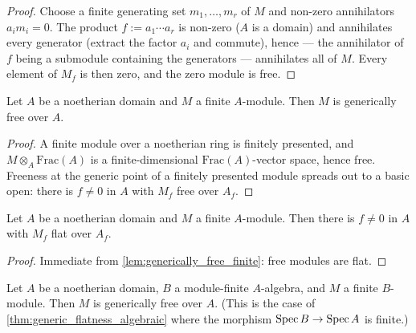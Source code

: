 \begin{proof}
\leanok
  Choose a finite generating set \(m_1, \dots, m_r\) of \(M\) and non-zero
  annihilators \(a_i m_i = 0\).  The product \(f := a_1 \cdots a_r\) is
  non-zero (\(A\) is a domain) and annihilates every generator (extract the
  factor \(a_i\) and commute), hence — the annihilator of \(f\) being a
  submodule containing the generators — annihilates all of \(M\).  Every
  element of \(M_f\) is then zero, and the zero module is free.
\end{proof}

\begin{lemma}\leanok
  \label{lem:generically_free_finite}
  Let \(A\) be a noetherian domain and \(M\) a finite \(A\)-module.  Then \(M\)
  is generically free over \(A\).
\end{lemma}

\begin{proof}
\leanok
  A finite module over a noetherian ring is finitely presented, and
  \(M \otimes_A \mathrm{Frac}(A)\) is a finite-dimensional
  \(\mathrm{Frac}(A)\)-vector space, hence free.  Freeness at the generic
  point of a finitely presented module spreads out to a basic open: there is
  \(f \ne 0\) in \(A\) with \(M_f\) free over \(A_f\).
\end{proof}

\begin{lemma}\leanok
  \label{lem:generically_flat_finite}
  Let \(A\) be a noetherian domain and \(M\) a finite \(A\)-module.  Then there
  is \(f \ne 0\) in \(A\) with \(M_f\) flat over \(A_f\).
\end{lemma}

\begin{proof}
\leanok
  Immediate from \cref{lem:generically_free_finite}: free modules are flat.
\end{proof}

\begin{lemma}\leanok
  \label{lem:generically_free_module_finite}
  Let \(A\) be a noetherian domain, \(B\) a module-finite \(A\)-algebra, and
  \(M\) a finite \(B\)-module.  Then \(M\) is generically free over \(A\).
  (This is the case of \cref{thm:generic_flatness_algebraic} where the
  morphism \(\operatorname{Spec} B \to \operatorname{Spec} A\) is finite.)
\end{lemma}

